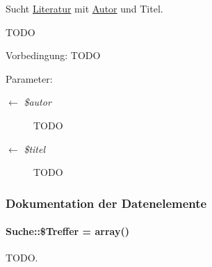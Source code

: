 Sucht \hyperlink{classLiteratur}{Literatur} mit \hyperlink{classAutor}{Autor} und Titel. 

TODO \begin{Desc}
\item[Vorbedingung:]TODO \end{Desc}
\begin{Desc}
\item[Parameter:]
\begin{description}
\item[\mbox{$\leftarrow$} {\em \$autor}]TODO \item[\mbox{$\leftarrow$} {\em \$titel}]TODO \end{description}
\end{Desc}


\subsubsection{Dokumentation der Datenelemente}
\hypertarget{classSuche_0ee0e1ffb3f79392915fd39934d7140d}{
\paragraph[\$Treffer]{\setlength{\rightskip}{0pt plus 5cm}Suche::\$Treffer = array()}\hfill}
\label{classSuche_0ee0e1ffb3f79392915fd39934d7140d}


TODO. 

